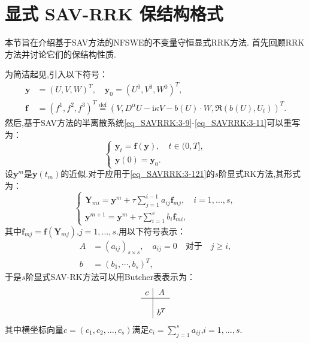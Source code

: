 \section{显式 SAV-RRK 保结构格式}\label{Section_SAVRRK: 4}
本节旨在介绍基于SAV方法的NFSWE的不变量守恒显式RRK方法.
首先回顾RRK方法并讨论它们的保结构性质.

为简洁起见,引入以下符号：
\begin{equation}
	\begin{aligned}
		\bm{y}&=\left(U,V,W\right)^T,\quad\bm{y}_0=\left(U^0,V^0,W^0\right)^T , \\
		\bm{f}&=(f^1,f^2,f^3)^T\overset{\text{def}}{=}(V,D^{\alpha} U-\mathrm{i}\kappa V-b(U)\cdot W,\Re\left(b(U), U_t\right))^T.
	\end{aligned}
\end{equation}
然后,基于SAV方法的半离散系统\eqref{eq_SAVRRK:3-9}-\eqref{eq_SAVRRK:3-11}可以重写为：
\begin{equation}
\left\{\begin{array}{l}
\bm{y}_t=\bm{f}(\bm{y}),\quad t \in(0, T],\\
\bm{y}(0)=\bm{y}_0.
\end{array}\right.\label{eq_SAVRRK:3-121}
\end{equation}
设$\bm{y}^m$是$\bm{y}\left(t_m\right)$的近似.对于应用于\eqref{eq_SAVRRK:3-121}的$s$阶显式RK方法\cite{hairerRungeKuttaMethods2015},其形式为：
\begin{equation}
\left\{\begin{array}{l}
\bm{Y}_{m i}=\bm{y}^m+\tau \sum\limits_{j=1}^{i-1} a_{i j} \bm{f}_{m j}, \quad i=1, \ldots, s, \\
\bm{y}^{m+1}=\bm{y}^m+\tau \sum\limits_{i=1}^s b_i \bm{f}_{m i},
\end{array}\right.\label{eq_SAVRRK:4-31}
\end{equation}
其中$\bm{f}_{m j}=\bm{f}\left(\bm{Y}_{m j}\right)$,$j=1, \ldots, s$.用以下符号表示：
\begin{equation}
\begin{aligned}
A & =\left(a_{i j}\right)_{s \times s}, \quad a_{i j}=0 \quad \text {对于} \quad j \geq i, \\
b & =\left(b_1, \cdots, b_s\right)^T,
\end{aligned}
\end{equation}
于是$s$阶显式SAV-RK方法可以用Butcher表表示为：
\begin{equation}
\begin{array}{c|c}
c & A \\
\hline \\
& b^T
\end{array}
\end{equation}
其中横坐标向量$c=(c_1,c_2,\dots,c_s)$满足$c_i=\sum\limits_{j=1}^s a_{i j}$,$i=1, \ldots, s$.

